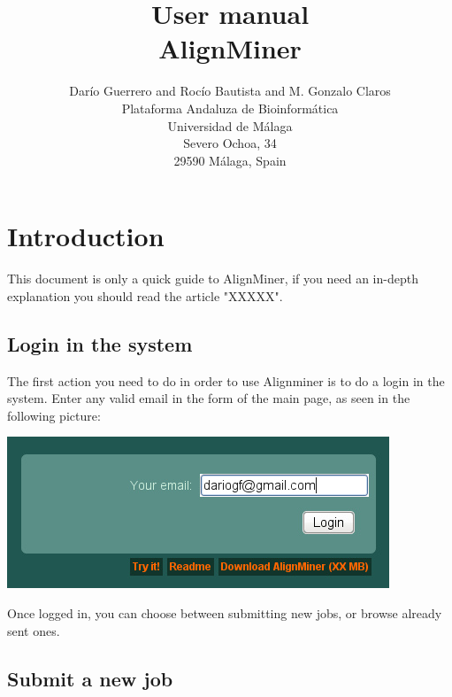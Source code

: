 \documentclass[12pt,oneside,a4paper,english]{article}  %
\title{User manual\\AlignMiner}
\author{Darío Guerrero and 
         Rocío Bautista and 
         M. Gonzalo Claros \\
         Plataforma Andaluza de Bioinformática\\ Universidad de Málaga\\ Severo Ochoa, 34\\ 29590 Málaga, Spain
      }
\begin{document}
	


\maketitle



\section{Introduction}\label{sec:introduction} %

This document is only a quick guide to AlignMiner, if you need an in-depth explanation you should read the article "XXXXX".





\subsection{Login in the system}

The first action you need to do in order to use Alignminer is to do a login in the system. Enter any valid email in the form of the main page, as seen in the following picture:

\begin{center}
		\includegraphics[width=.5\linewidth]{pics/login.jpg}
\end{center}

Once logged in, you can choose between submitting new jobs, or browse already sent ones.

\subsection{Submit a new job}
\end{document}
